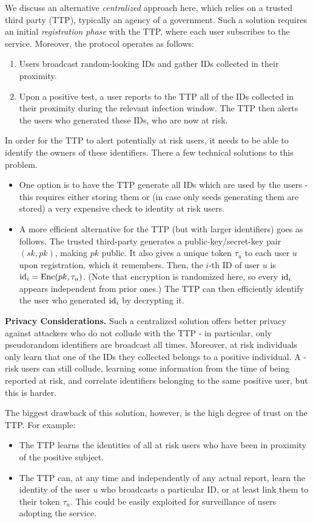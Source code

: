 \documentclass{article}
\begin{document}
We discuss an alternative {\em centralized} approach here, which relies on a trusted third party (TTP), typically an agency of a government. Such a solution requires an initial {\em registration phase} with the TTP, where each user subscribes to the service. Moreover, the protocol operates as follows:
\begin{enumerate}    
\item Users broadcast random-looking IDs and gather IDs collected in their proximity. 
\item Upon a positive test, a user reports to the TTP all of the IDs collected in their proximity during the relevant infection window. The TTP then alerts the users who generated these IDs, who are now at risk.
\end{enumerate}
In order for the TTP to alert potentially at risk users, it needs to be able to identify the owners of these identifiers. There a few technical solutions to this problem. 
\begin{itemize}
\item One option is to have the TTP generate all IDs which are used by the users - this requires either storing them or (in case only seeds generating them are stored) a very expensive check to identity at risk users.
\item A more efficient alternative for the TTP (but with larger identifiers) goes as follows. The trusted third-party generates a public-key/secret-key pair $(sk, pk)$, making $pk$ public. It also gives a unique token $\tau_u$ to each user $u$ upon registration, which it remembers. Then, the $i$-th ID of user $u$ is $\mathrm{id}_i = \mathrm{Enc}(pk,\tau_u)$. (Note that encryption is randomized here, so every $\mathrm{id}_i$ appears independent from prior ones.) The TTP can then efficiently identify the user who generated $\mathrm{id}_i$ by decrypting it. 
\end{itemize}

{\bf Privacy Considerations.} Such a centralized solution offers better privacy against attackers who do not collude with the TTP - in particular, only pseudorandom identifiers are broadcast all times. Moreover, at risk individuals only learn that one of the IDs they collected belongs to a positive individual. A -risk users can still collude, learning some information from the time of being reported at risk, and correlate identifiers belonging to the same positive user, but this is harder.  

The biggest drawback of this solution, however, is the high degree of trust on the TTP. For example:
\begin{itemize}
    \item The TTP learns the identities of all at risk users who have been in proximity of the positive subject.  
    \item The TTP can, at any time and independently of any actual report, learn the identity of the user $u$ who broadcasts a particular ID, or at least link them to their token $\tau_u$. This could be easily exploited for surveillance of users adopting the service.
\end{itemize}
\end{document}
